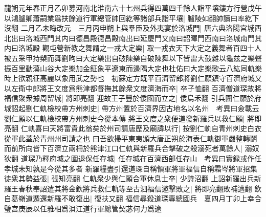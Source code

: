 龍朔元年春正月乙卯募河南北淮南六十七州兵得四萬四千餘人詣平壤鏤方行營戊午以鴻臚卿蕭嗣業爲扶餘道行軍總管帥回紇等諸部兵詣平壤|{
	臚陵如翻帥讀曰率紇下沒翻}
二月乙未晦改元　三月丙申朔上與羣臣及外夷宴於洛城門|{
	唐六典洛陽宫城西北出曰洛城西門其内曰德昌殿德昌殿南出曰延慶門又南曰韶暉門西南曰洛城南門其内曰洛城殿}
觀屯營新教之舞謂之一戎大定樂|{
	取一戎衣天下大定之義舞者百四十人被五采甲持槊而舞劉昫曰大定樂出自破陳樂自破陳舞以下皆雷大鼓雜以龜兹之樂聲振百里動蕩山谷大定樂加金鉦象平遼東而邊隅大定也杜佑曰大定樂歌云八紘同軌樂}
時上欲親征高麗以象用武之勢也　初蘇定方既平百濟留郎將劉仁願鎮守百濟府城又以左衛中郎將王文度爲熊津都督撫其餘衆文度濟海而卒|{
	卒子恤翻}
百濟僧道琛故將福信聚衆據周留城|{
	將即亮翻}
迎故王子豐於倭國而立之|{
	倭烏禾翻}
引兵圍仁願於府城詔起劉仁軌檢校帶方州刺史|{
	帶方州置於百濟界因古地名以名州　考異曰僉載云劉仁願以仁軌檢校帶方州刺史今從本傳}
將王文度之衆便道發新羅兵以救仁願|{
	將即亮翻}
仁軌喜曰天將富貴此翁矣於州司請唐歷及廟諱以行|{
	按劉仁軌自青州刺史白衣從軍此蓋於青州州司請之也}
曰吾欲掃平東夷頒大唐正朔於海表仁軌御軍嚴整轉鬬而前所向皆下百濟立兩柵於熊津江口仁軌與新羅兵合擊破之殺溺死者萬餘人|{
	溺奴狄翻}
道琛乃釋府城之圍退保任存城|{
	任存城在百濟西部任存山　考異曰實録或作任孝城未知孰是今從其多者}
新羅糧盡引還道琛自稱領軍將軍福信自稱霜岑將軍招集徒衆其勢益張|{
	張知亮翻}
仁軌衆少與仁願合軍休息士卒|{
	少詩沼翻}
上詔新羅出兵新羅王春秋奉詔遣其將金欽將兵救仁軌等至古泗福信邀擊敗之|{
	將即亮翻敗補邁翻}
欽自葛嶺道遁還新羅不敢復出|{
	復扶又翻}
福信尋殺道琛專總國兵　夏四月丁卯上幸合璧宫庚辰以任雅相爲浿江道行軍總管契苾何力爲遼

